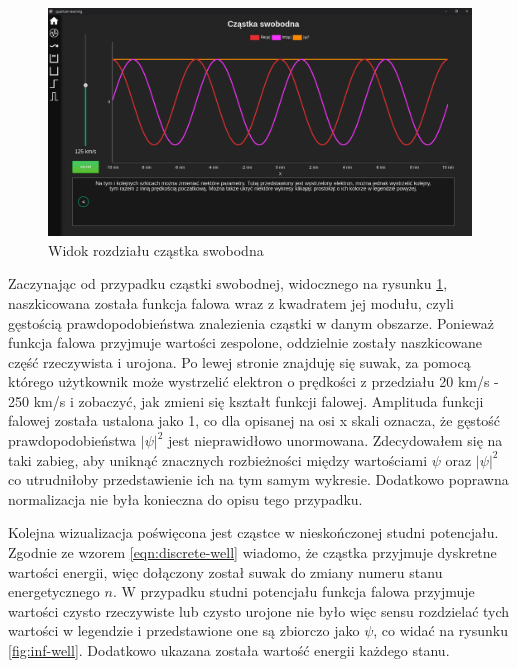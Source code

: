 \documentclass{SGGW-thesis}
\begin{document}
	\begin{figure}[H]
	\includegraphics[width=\textwidth,height=\textheight,keepaspectratio]{free.png} 
	\caption{Widok rozdziału cząstka swobodna}
	\label{fig:free-chart}
	\end{figure}	
	
	Zaczynając od przypadku cząstki swobodnej, widocznego na rysunku \ref{fig:free-chart}, naszkicowana została funkcja falowa wraz z kwadratem jej modułu, czyli gęstością prawdopodobieństwa znalezienia cząstki w danym obszarze. Ponieważ funkcja falowa przyjmuje wartości zespolone, oddzielnie zostały naszkicowane część rzeczywista i urojona. Po lewej stronie znajduję się suwak, za pomocą którego użytkownik może wystrzelić elektron o prędkości z przedziału 20 km/s - 250 km/s i zobaczyć, jak zmieni się kształt funkcji falowej. Amplituda funkcji falowej została ustalona jako 1, co dla opisanej na osi x skali oznacza, że gęstość prawdopodobieństwa $|\psi|^2$ jest nieprawidłowo unormowana. Zdecydowałem się na taki zabieg, aby uniknąć znacznych rozbieżności między wartościami $\psi$ oraz $|\psi|^2$ co utrudniłoby przedstawienie ich na tym samym wykresie. Dodatkowo poprawna normalizacja nie była konieczna do opisu tego przypadku. 
	
	Kolejna wizualizacja poświęcona jest cząstce w nieskończonej studni potencjału. Zgodnie ze wzorem \ref{eqn:discrete-well} wiadomo, że cząstka przyjmuje dyskretne wartości energii, więc dołączony został suwak do zmiany numeru stanu energetycznego $n$. W przypadku studni potencjału funkcja falowa przyjmuje wartości czysto rzeczywiste lub czysto urojone nie było więc sensu rozdzielać tych wartości w legendzie i przedstawione one są zbiorczo jako $\psi$, co widać na rysunku \ref{fig:inf-well}. Dodatkowo ukazana została wartość energii każdego stanu.
	
\end{document}
